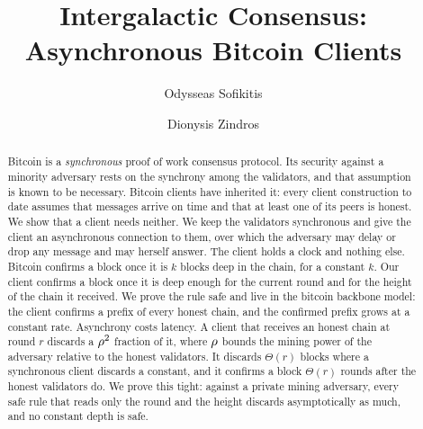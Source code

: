 \documentclass[runningheads]{llncs}
\begin{document}
\title{Intergalactic Consensus:\\Asynchronous Bitcoin Clients}
\author{Odysseas Sofikitis \and Dionysis Zindros}
\maketitle

\begin{abstract}
Bitcoin is a \emph{synchronous} proof of work consensus protocol. Its security
against a minority adversary rests on the synchrony among the validators, and
that assumption is known to be necessary. Bitcoin clients have inherited it:
every client construction to date assumes that messages arrive on time and that
at least one of its peers is honest. We show that a client needs neither. We
keep the validators synchronous and give the client an asynchronous connection
to them, over which the adversary may delay or drop any message and may herself
answer. The client holds a clock and nothing else. Bitcoin confirms a block once
it is $k$ blocks deep in the chain, for a constant $k$. Our client confirms a
block once it is deep enough for the current round and for the height of the
chain it received. We prove the rule safe and live in the bitcoin backbone
model: the client confirms a prefix of every honest chain, and the confirmed
prefix grows at a constant rate. Asynchrony costs latency. A client that
receives an honest chain at round $r$ discards a $\rho^2$ fraction of it,
where $\rho$ bounds the mining power of the adversary relative to the honest
validators. It discards $\Theta(r)$ blocks
where a synchronous client discards a constant, and it confirms a block
$\Theta(r)$ rounds after the honest validators do. We prove this tight:
against a private mining adversary, every safe rule that reads only the round and
the height discards asymptotically as much, and no constant depth is safe.
\end{abstract}












\appendix

\end{document}

